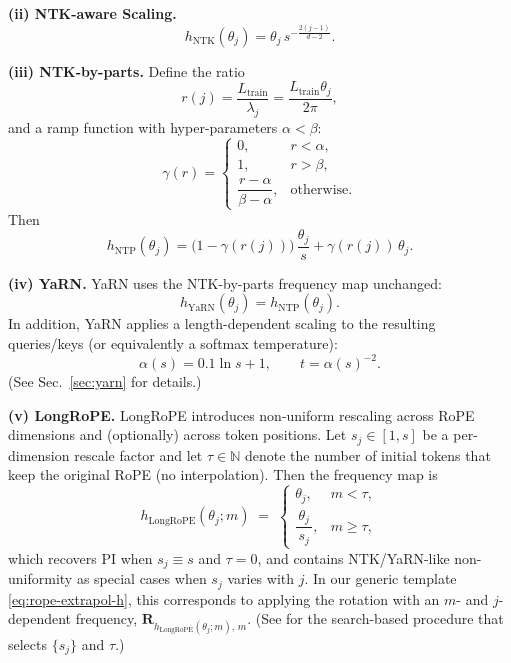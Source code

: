 \medskip
\noindent\textbf{(ii) NTK-aware Scaling.}
\begin{equation}
  h_{\text{NTK}}(\theta_j)
  = \theta_j\,s^{-\tfrac{2(j-1)}{\,d-2\,}}.
  \label{eq:h-ntk}
\end{equation}

\medskip
\noindent\textbf{(iii) NTK-by-parts.}
Define the ratio
\begin{equation}
  r(j)=\frac{L_{\text{train}}}{\lambda_j}
      =\frac{L_{\text{train}}\theta_j}{2\pi},
  \label{eq:rj}
\end{equation}
and a ramp function with hyper-parameters \(\alpha<\beta\):
\begin{equation}
  \gamma(r)=
  \begin{cases}
    0, & r<\alpha,\\[4pt]
    1, & r>\beta,\\[4pt]
    \dfrac{r-\alpha}{\beta-\alpha}, & \text{otherwise}.
  \end{cases}
  \label{eq:gamma}
\end{equation}
Then
\begin{equation}
  h_{\text{NTP}}(\theta_j)
    = \bigl(1-\gamma(r(j))\bigr)\,\frac{\theta_j}{s}
      + \gamma(r(j))\,\theta_j.
  \label{eq:h-ntp-unified}
\end{equation}

\medskip
\noindent\textbf{(iv) YaRN.}
YaRN uses the NTK-by-parts frequency map unchanged:
\begin{equation}
  h_{\text{YaRN}}(\theta_j)=h_{\text{NTP}}(\theta_j).
  \label{eq:h-yarn}
\end{equation}
In addition, YaRN applies a length-dependent scaling to the resulting
queries/keys (or equivalently a softmax temperature):
\begin{equation}
  \alpha(s)=0.1\ln s + 1,
  \qquad
  t=\alpha(s)^{-2}.
  \label{eq:yarn-alpha-unified}
\end{equation}
(See Sec.~\ref{sec:yarn} for details.)

\medskip
\noindent\textbf{(v) LongRoPE.}
LongRoPE introduces non-uniform rescaling across RoPE dimensions and (optionally) across token positions. 
Let \(s_j \in [1,s]\) be a per-dimension rescale factor and let \(\tau\in\mathbb{N}\) denote the number of initial tokens that keep the original RoPE (no interpolation). 
Then the frequency map is
\begin{equation}
  h_{\text{LongRoPE}}(\theta_j;m)
  \;=\;
  \begin{cases}
    \theta_j, & m<\tau,\\[4pt]
    \dfrac{\theta_j}{\,s_j\,}, & m\ge \tau,
  \end{cases}
  \label{eq:h-longrope-unified}
\end{equation}
which recovers PI when \(s_j\equiv s\) and \(\tau=0\), and contains NTK/YaRN-like non-uniformity as special cases when \(s_j\) varies with \(j\). 
In our generic template \eqref{eq:rope-extrapol-h}, this corresponds to applying the rotation with an \(m\)- and \(j\)-dependent frequency,
\(
\mathbf R_{h_{\text{LongRoPE}}(\theta_j;m),\,m}.
\)
(See \cite{ding2024longrope} for the search-based procedure that selects \(\{s_j\}\) and \(\tau\).)

